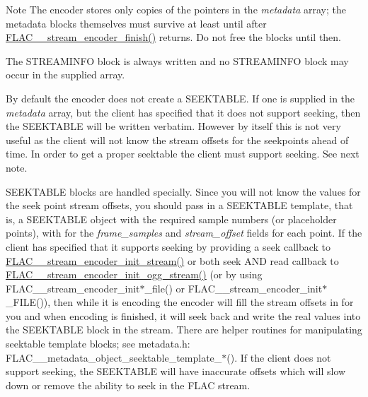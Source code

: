 \begin{DoxyNote}{Note}
The encoder stores only copies of the pointers in the {\itshape metadata} array; the metadata blocks themselves must survive at least until after \mbox{\hyperlink{group__flac__stream__encoder_gab2c1e5477c1e3fe9ad0d722ff8eecda2}{F\+L\+A\+C\+\_\+\+\_\+stream\+\_\+encoder\+\_\+finish()}} returns. Do not free the blocks until then.

The S\+T\+R\+E\+A\+M\+I\+N\+FO block is always written and no S\+T\+R\+E\+A\+M\+I\+N\+FO block may occur in the supplied array.

By default the encoder does not create a S\+E\+E\+K\+T\+A\+B\+LE. If one is supplied in the {\itshape metadata} array, but the client has specified that it does not support seeking, then the S\+E\+E\+K\+T\+A\+B\+LE will be written verbatim. However by itself this is not very useful as the client will not know the stream offsets for the seekpoints ahead of time. In order to get a proper seektable the client must support seeking. See next note.

S\+E\+E\+K\+T\+A\+B\+LE blocks are handled specially. Since you will not know the values for the seek point stream offsets, you should pass in a S\+E\+E\+K\+T\+A\+B\+LE \textquotesingle{}template\textquotesingle{}, that is, a S\+E\+E\+K\+T\+A\+B\+LE object with the required sample numbers (or placeholder points), with {} for the {\itshape frame\+\_\+samples} and {\itshape stream\+\_\+offset} fields for each point. If the client has specified that it supports seeking by providing a seek callback to \mbox{\hyperlink{group__flac__stream__encoder_ga85221c4ceb9f22dfd4983d8f07a9a35b}{F\+L\+A\+C\+\_\+\+\_\+stream\+\_\+encoder\+\_\+init\+\_\+stream()}} or both seek A\+ND read callback to \mbox{\hyperlink{group__flac__stream__encoder_ga87af71d74c09f7d482f9f420ef9bf826}{F\+L\+A\+C\+\_\+\+\_\+stream\+\_\+encoder\+\_\+init\+\_\+ogg\+\_\+stream()}} (or by using F\+L\+A\+C\+\_\+\+\_\+stream\+\_\+encoder\+\_\+init$\ast$\+\_\+file() or F\+L\+A\+C\+\_\+\+\_\+stream\+\_\+encoder\+\_\+init$\ast$\+\_\+\+F\+I\+LE()), then while it is encoding the encoder will fill the stream offsets in for you and when encoding is finished, it will seek back and write the real values into the S\+E\+E\+K\+T\+A\+B\+LE block in the stream. There are helper routines for manipulating seektable template blocks; see metadata.\+h\+: F\+L\+A\+C\+\_\+\+\_\+metadata\+\_\+object\+\_\+seektable\+\_\+template\+\_\+$\ast$(). If the client does not support seeking, the S\+E\+E\+K\+T\+A\+B\+LE will have inaccurate offsets which will slow down or remove the ability to seek in the F\+L\+AC stream.


\end{DoxyNote}
